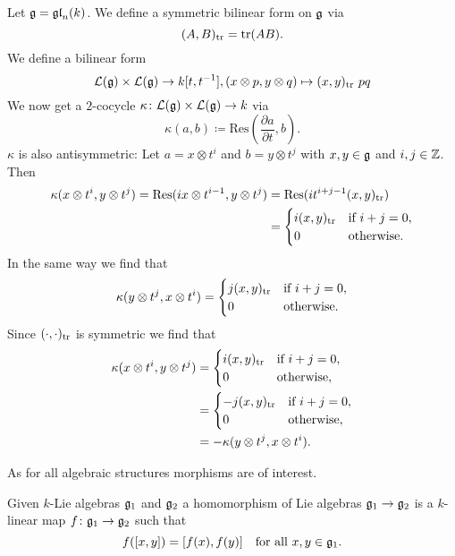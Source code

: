 \begin{expl}
 Let $\mathfrak{g} = \mathfrak{gl}_n(k)$. We define a symmetric bilinear form on $\mathfrak{g}$ via
 \[
  (A,B)_{\operatorname{tr}} = \operatorname{tr}(AB).
 \]
 We define a bilinear form
 \[
  \mathcal{L}(\mathfrak{g}) \times \mathcal{L}(\mathfrak{g}) \to k[t,t^{-1}],
  (x \otimes p, y \otimes q) \mapsto (x,y)_{\operatorname{tr}}\ pq
 \]
 We now get a $2$-cocycle $\kappa \colon \mathcal{L}(\mathfrak{g}) \times \mathcal{L}(\mathfrak{g}) \to k$ via
 \[
  \kappa(a,b) \coloneqq \mathrm{Res}\left(\frac{\partial a}{\partial t}, b\right).
 \]
 $\kappa$ is also antisymmetric: Let $a = x \otimes t^i$ and $b = y \otimes t^j$ with $x,y \in \mathfrak{g}$ and $i,j \in \mathbb{Z}$. Then
 \begin{align*}
  \kappa(x \otimes t^i, y \otimes t^j)
  = \mathrm{Res}(i x \otimes t^{i-1}, y \otimes t^j)
  &= \mathrm{Res}(i t^{i+j-1} (x,y)_{\operatorname{tr}}) \\
  &=
  \begin{cases}
   i (x,y)_{\operatorname{tr}} & \text{if $i+j = 0$}, \\
               0 & \text{otherwise}.
  \end{cases}
 \end{align*}
 In the same way we find that
 \[
  \kappa(y \otimes t^j, x \otimes t^i) =
  \begin{cases}
   j (x,y)_{\operatorname{tr}} & \text{if $i+j = 0$}, \\
               0 & \text{otherwise}.
  \end{cases}
 \]
 Since $(\cdot,\cdot)_{\operatorname{tr}}$ is symmetric we find that
 \begin{align*}
  \kappa(x \otimes t^i, y \otimes t^j)
  &=
  \begin{cases}
   i (x,y)_{\operatorname{tr}} & \text{if $i+j = 0$}, \\
               0 & \text{otherwise},
  \end{cases} \\
  &=
  \begin{cases}
   -j (x,y)_{\operatorname{tr}} & \text{if $i+j = 0$}, \\
                0 & \text{otherwise},
  \end{cases} \\
  &=
  -\kappa(y \otimes t^j, x \otimes t^i).
 \end{align*}
\end{expl}


As for all algebraic structures morphisms are of interest.


\begin{defi}
 Given $k$-Lie algebras $\mathfrak{g}_1$ and $\mathfrak{g}_2$ a homomorphism of Lie algebras $\mathfrak{g}_1 \to \mathfrak{g}_2$ is a $k$-linear map $f \colon \mathfrak{g}_1 \to \mathfrak{g}_2$ such that
 \[
  f([x,y]) =[f(x),f(y)] \quad \text{for all $x,y \in \mathfrak{g}_1$}.
 \]
\end{defi}


